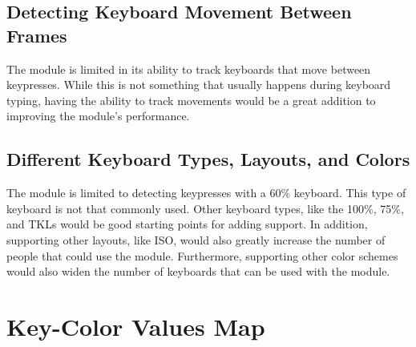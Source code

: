 \documentclass{report}
\begin{document}
\section{Detecting Keyboard Movement Between Frames}
The module is limited in its ability to track keyboards that move between
keypresses. While this is not something that usually happens during keyboard
typing, having the ability to track movements would be a great addition to
improving the module's performance.

\section{Different Keyboard Types, Layouts, and Colors}
The module is limited to detecting keypresses with a 60\% keyboard. This type of
keyboard is not that commonly used. Other keyboard types, like the 100\%, 75\%,
and TKLs would be good starting points for adding support. In addition,
supporting other layouts, like ISO, would also greatly increase the number of
people that could use the module. Furthermore, supporting other color schemes
would also widen the number of keyboards that can be used with the module.

\newpage
\appendix

\twocolumn
\chapter{Key-Color Values Map}
\label{appendix:key-map}
\end{document}
